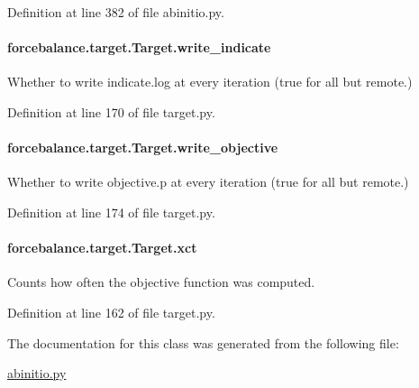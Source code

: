 Definition at line 382 of file abinitio.\-py.

\hypertarget{classforcebalance_1_1target_1_1Target_a3a2f5d4bbb8d6ecb580eadb261977a57}{
\paragraph[{write\-\_\-indicate}]{\setlength{\rightskip}{0pt plus 5cm}forcebalance.\-target.\-Target.\-write\-\_\-indicate\hspace{0.3cm}{\ttfamily [inherited]}}}\label{classforcebalance_1_1target_1_1Target_a3a2f5d4bbb8d6ecb580eadb261977a57}


Whether to write indicate.\-log at every iteration (true for all but remote.) 



Definition at line 170 of file target.\-py.

\hypertarget{classforcebalance_1_1target_1_1Target_a7a95624dfe03f0cee0e5f1ae09db306a}{
\paragraph[{write\-\_\-objective}]{\setlength{\rightskip}{0pt plus 5cm}forcebalance.\-target.\-Target.\-write\-\_\-objective\hspace{0.3cm}{\ttfamily [inherited]}}}\label{classforcebalance_1_1target_1_1Target_a7a95624dfe03f0cee0e5f1ae09db306a}


Whether to write objective.\-p at every iteration (true for all but remote.) 



Definition at line 174 of file target.\-py.

\hypertarget{classforcebalance_1_1target_1_1Target_aad2e385cfbf7b4a68f1c2cb41133fe82}{
\paragraph[{xct}]{\setlength{\rightskip}{0pt plus 5cm}forcebalance.\-target.\-Target.\-xct\hspace{0.3cm}{\ttfamily [inherited]}}}\label{classforcebalance_1_1target_1_1Target_aad2e385cfbf7b4a68f1c2cb41133fe82}


Counts how often the objective function was computed. 



Definition at line 162 of file target.\-py.



The documentation for this class was generated from the following file\-:\begin{DoxyCompactItemize}
\item 
\hyperlink{abinitio_8py}{abinitio.\-py}\end{DoxyCompactItemize}
